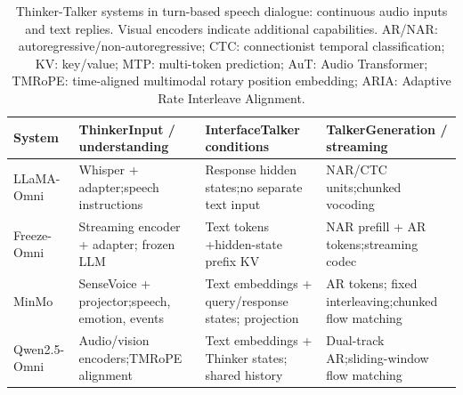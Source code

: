 \begin{table}[t]
    \centering
    \caption{Thinker-Talker systems in turn-based speech dialogue: continuous audio inputs and text replies. Visual encoders indicate additional capabilities. AR/NAR: autoregressive/non-autoregressive; CTC: connectionist temporal classification; KV: key/value; MTP: multi-token prediction; AuT: Audio Transformer; TMRoPE: time-aligned multimodal rotary position embedding; ARIA: Adaptive Rate Interleave Alignment.}
    \label{tab:thinker-talker}
    \small
    \setlength{\tabcolsep}{4pt}
    \renewcommand{\arraystretch}{1.1}
    \begin{tabular}{@{}>{\raggedright\arraybackslash}p{}>{\raggedright\arraybackslash}p{}>{\raggedright\arraybackslash}p{}>{\raggedright\arraybackslash}p{}@{}}
        \toprule
        \textbf{System} & \textbf{Thinker}\newline Input / understanding & \textbf{Interface}\newline Talker conditions & \textbf{Talker}\newline Generation / streaming \\
        \midrule
        LLaMA-Omni\newline\citep{DBLP:conf/iclr/FangGZMZ025} & Whisper + adapter;\newline speech instructions & Response hidden states;\newline no separate text input & NAR/CTC units;\newline chunked vocoding \\
        \addlinespace
        Freeze-Omni\newline\citep{DBLP:conf/icml/WangLFZS000M25} & Streaming encoder + adapter; frozen LLM & Text tokens +\newline hidden-state prefix KV & NAR prefill + AR tokens;\newline streaming codec \\
        \addlinespace
        MinMo\newline\citep{DBLP:journals/corr/abs-2501-06282} & SenseVoice + projector;\newline speech, emotion, events & Text embeddings + query/response states; projection & AR tokens; fixed interleaving;\newline chunked flow matching \\
        \addlinespace
        Qwen2.5-Omni\newline\citep{DBLP:journals/corr/abs-2503-20215} & Audio/vision encoders;\newline TMRoPE alignment & Text embeddings + Thinker states; shared history & Dual-track AR;\newline sliding-window flow matching \\

\end{tabular}
\end{table}
